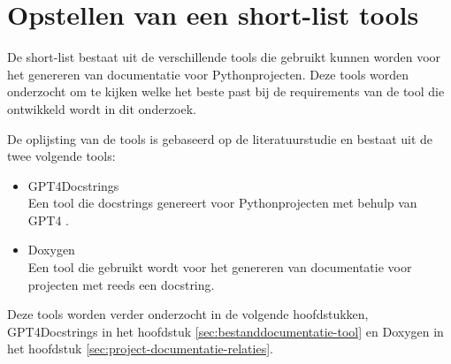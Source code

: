 \begin{table}
    \caption{Requirementsanalyse}
\end{table}

\section{Opstellen van een short-list tools}
\label{sec:long-list}
De short-list bestaat uit de verschillende tools die gebruikt kunnen worden voor het genereren van documentatie voor Pythonprojecten.
Deze tools worden onderzocht om te kijken welke het beste past bij de requirements van de tool die ontwikkeld wordt in dit onderzoek.

De oplijsting van de tools is gebaseerd op de literatuurstudie en bestaat uit de twee volgende tools:
\begin{itemize} 
\item GPT4Docstrings \autocite{Trofficus2023}\\
Een tool die docstrings genereert voor Pythonprojecten met behulp van GPT4 \textcite{OpenAI2023}.
\item Doxygen \autocite{Doxygen2023}\\
Een tool die gebruikt wordt voor het genereren van documentatie voor projecten met reeds een docstring.
\end{itemize}

Deze tools worden verder onderzocht in de volgende hoofdstukken, GPT4Docstrings in het hoofdstuk \ref{sec:bestanddocumentatie-tool} en Doxygen in het hoofdstuk \ref{sec:project-documentatie-relaties}.